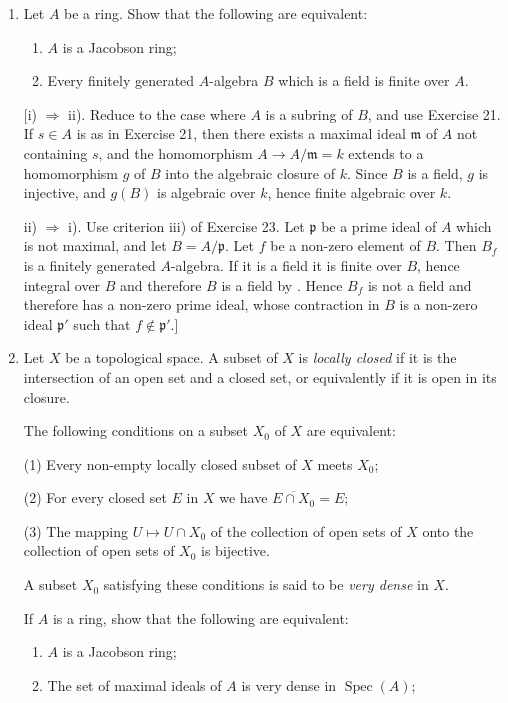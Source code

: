 \begin{enumerate}
\item Let $A$ be a ring. Show that the following are equivalent:
\begin{enumerate}
\renewcommand{\labelenumii}{\roman{enumii})}
\item $A$ is a Jacobson ring;
\item Every finitely generated $A$-algebra $B$ which is a field is finite over $A$.
\end{enumerate}
[i) $\Rightarrow$ ii). Reduce to the case where $A$ is a subring of $B$, and use Exercise 21. If $s\in A$ is as in Exercise 21, then there exists a maximal ideal $\mathfrak m$ of $A$ not containing $s$, and the homomorphism $A\longrightarrow A/\mathfrak m=k$ extends to a homomorphism $g$ of $B$ into the algebraic closure of $k$. Since $B$ is a field, $g$ is injective, and $g(B)$ is algebraic over $k$, hence finite algebraic over $k$.

ii) $\Rightarrow$ i). Use criterion iii) of Exercise 23. Let $\mathfrak p$ be a prime ideal of $A$ which is not maximal, and let $B=A/\mathfrak p$. Let $f$ be a non-zero element of $B$. Then $B_f$ is a finitely generated $A$-algebra. If it is a field it is finite over $B$, hence integral over $B$ and therefore $B$ is a field by . Hence $B_f$ is not a field and therefore has a non-zero prime ideal, whose contraction in $B$ is a non-zero ideal $\mathfrak p'$ such that $f\notin\mathfrak p'$.]

\item Let $X$ be a topological space. A subset of $X$ is \textit{locally closed} if it is the intersection of an open set and a closed set, or equivalently if it is open in its closure.

The following conditions on a subset $X_0$ of $X$ are equivalent:

(1) Every non-empty locally closed subset of $X$ meets $X_0$;

(2) For every closed set $E$ in $X$ we have $\overline{E\cap X_0}=E$;

(3) The mapping $U\mapsto U\cap X_0$ of the collection of open sets of $X$ onto the collection of open sets of $X_0$ is bijective.

A subset $X_0$ satisfying these conditions is said to be \textit{very dense} in $X$.

If $A$ is a ring, show that the following are equivalent:
\begin{enumerate}
\renewcommand{\labelenumii}{\roman{enumii})}
\item $A$ is a Jacobson ring;
\item The set of maximal ideals of $A$ is very dense in $\operatorname{Spec}(A)$;
\end{enumerate}
\end{enumerate}
